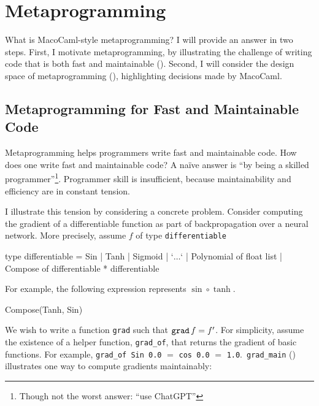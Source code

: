 \section{Metaprogramming}\label{section:metaprogramming-technical}
What is MacoCaml-style metaprogramming? I will provide an answer in two steps. First, I motivate metaprogramming, by illustrating the challenge of writing code that is both fast and maintainable (). Second, I will consider the design space of metaprogramming (), highlighting decisions made by MacoCaml.

\subsection{Metaprogramming for Fast and Maintainable Code}\label{subsection:metaprogramming-motivation}

Metaprogramming helps programmers write fast and maintainable code. How does one write fast and maintainable code? A naïve answer is ``by being a skilled programmer''\footnote{Though not the worst answer: ``use ChatGPT''}. Programmer skill is insufficient, because maintainability and efficiency are in constant tension. 

I illustrate this tension by considering a concrete problem. Consider computing the gradient of a differentiable function as part of backpropagation over a neural network. More precisely, assume $f$ of type \texttt{differentiable}

\begin{ocaml}
type differentiable = Sin | Tanh | Sigmoid | `$\ldots$`
                    | Polynomial of float list
                    | Compose of differentiable * differentiable
\end{ocaml}
For example, the following expression represents $\sin\circ \tanh$. 
\begin{ocaml}
Compose(Tanh, Sin)
\end{ocaml}

We wish to write a function \texttt{grad} such that $\text{\texttt{grad}} \, f = f'$. For simplicity, assume the existence of a helper function, \texttt{grad_of}, that returns the gradient of basic functions. For example, \texttt{grad_of Sin 0.0} $=$ \texttt{cos 0.0} $=$ \texttt{1.0}.\ \texttt{grad_main} () illustrates one way to compute gradients maintainably: 

